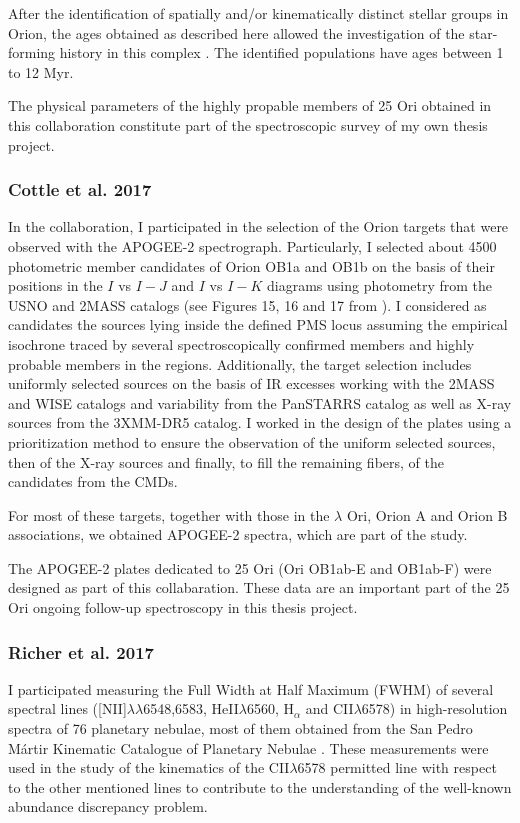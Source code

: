 \documentclass[12pt]{article}
\begin{document}
After the identification of spatially and/or kinematically distinct stellar groups in Orion, the ages obtained as described here allowed the investigation of the star-forming history in this complex \citep{Kounkel2018}. The identified populations have ages between 1 to 12 Myr.

The physical parameters of the highly propable members of 25 Ori obtained in this collaboration constitute part of the spectroscopic survey of my own thesis project.

\subsubsection{Cottle et al. 2017}
\label{sec:Cottle}
In the \citet{Cottle2018} collaboration, I participated in the selection of the Orion targets that were observed with the APOGEE-2 spectrograph. Particularly, I selected about 4500 photometric member candidates of Orion OB1a and OB1b on the basis of their positions in the $I$ vs $I-J$ and $I$ vs $I-K$ diagrams using photometry from the USNO and 2MASS catalogs (see Figures 15, 16 and 17 from \citealt{Cottle2018}). I considered as candidates the sources lying inside the defined PMS locus assuming the empirical isochrone traced by several spectroscopically confirmed members and highly probable members in the regions. Additionally, the target selection includes uniformly selected sources on the basis of IR excesses working with the 2MASS and WISE catalogs and variability from the PanSTARRS catalog as well as X-ray sources from the 3XMM-DR5 catalog. I worked in the design of the plates using a prioritization method to ensure the observation of the uniform selected sources, then of the X-ray sources and finally, to fill the remaining fibers, of the candidates from the CMDs.

For most of these targets, together with those in the $\lambda$ Ori, Orion A and Orion B associations, we obtained APOGEE-2 spectra, which are part of the \citet{Kounkel2018} study. 

The APOGEE-2 plates dedicated to 25 Ori (Ori OB1ab-E and OB1ab-F) were designed as part of this collabaration. These data are an important part of the 25 Ori ongoing follow-up spectroscopy in this thesis project.

\subsubsection{Richer et al. 2017}
\label{sec:Richer}
I participated measuring the Full Width at Half Maximum (FWHM) of several spectral lines ([NII]$\lambda\lambda$6548,6583, HeII$\lambda$6560, H$_\alpha$ and CII$\lambda$6578) in high-resolution spectra of 76 planetary nebulae, most of them obtained from the San Pedro M\'artir Kinematic Catalogue of Planetary Nebulae \citep{Lopez2012}. These measurements were used in the \citet{Richer2017} study of the kinematics of the CII$\lambda$6578 permitted line with respect to the other mentioned lines to contribute to the understanding of the well-known abundance discrepancy problem.
\end{document}
